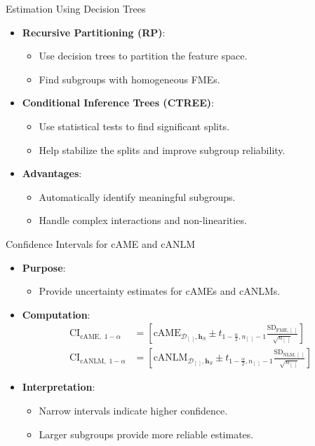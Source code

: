 \documentclass[11pt,compress,t,notes=noshow, aspectratio=169, xcolor=table]{beamer}
\newcommand{\boldhS}{\bm{h}_{S}}
\begin{document}
\begin{frame}{Estimation Using Decision Trees}
\begin{itemize}
\item \textbf{Recursive Partitioning (RP)}:
\begin{itemize}
\item Use decision trees to partition the feature space.
\item Find subgroups with homogeneous FMEs.
\end{itemize}
\item \textbf{Conditional Inference Trees (CTREE)}:
\begin{itemize}
\item Use statistical tests to find significant splits.
\item Help stabilize the splits and improve subgroup reliability.
\end{itemize}
\item \textbf{Advantages}:
\begin{itemize}
\item Automatically identify meaningful subgroups.
\item Handle complex interactions and non-linearities.
\end{itemize}
\end{itemize}
\end{frame}

\begin{frame}{Confidence Intervals for cAME and cANLM}
\begin{itemize}
\item \textbf{Purpose}:
\begin{itemize}
\item Provide uncertainty estimates for cAMEs and cANLMs.
\end{itemize}
\item \textbf{Computation}:
\begin{align*}
\text{CI}_{\text{cAME}, \; 1 - \alpha} &= \left[\text{cAME}_{\mathcal{D}_{[\;]}, \boldhS} \pm t_{1-\frac{\alpha}{2}, n_{[\;]}-1} \frac{\text{SD}_{\text{FME}, [\;]}}{\sqrt{n_{[\;]}}} \right] \\
\text{CI}_{\text{cANLM}, \; 1 - \alpha} &= \left[\text{cANLM}_{\mathcal{D}_{[\;]}, \boldhS} \pm t_{1-\frac{\alpha}{2}, n_{[\;]}-1} \frac{\text{SD}_{\text{NLM}, [\;]}}{\sqrt{n_{[\;]}}} \right]
\end{align*}
\item \textbf{Interpretation}:
\begin{itemize}
\item Narrow intervals indicate higher confidence.
\item Larger subgroups provide more reliable estimates.
\end{itemize}
\end{itemize}
\end{frame}
\end{document}
